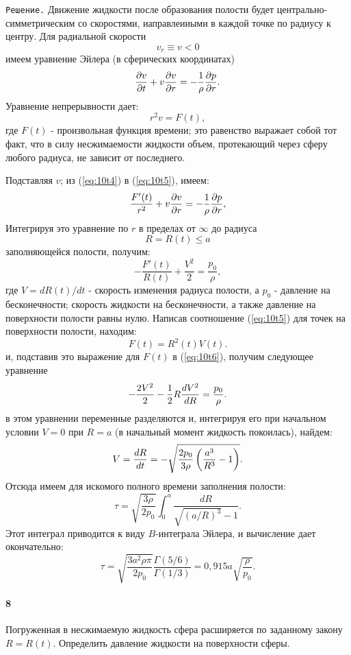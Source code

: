 \texttt{Решение.} Движение жидкости после образования полости будет
центрально-симметрическим со скоростями, иаправлеииыми  в каждой точке по
 радиусу к центру.  Для радиальной скорости
\[
   v_r \equiv v<0
\]
имеем уравнение Эйлера (в сферических координатах)
\begin{equation}
   \label{eq:10t4}
   \frac{\partial{v}}{\partial{t}} + v \frac{\partial{v}}{\partial{r}} = - \frac1{\rho} \frac{\partial{p}}{\partial{r}}.
\end{equation}
Уравнение непрерывности дает:
\begin{equation}
   \label{eq:10t5}
   r^2v = F(t),
\end{equation}
где  $F(t)$ - произвольная функция времени; это равенство выражает собой тот
факт, что в силу несжимаемости жидкости объем, протекающий через сферу любого
радиуса, не зависит от последнего.

Подставляя $v$; из (\ref{eq:10t4}) в (\ref{eq:10t5}), имеем:
\[
   \frac{F'(t)}{r^2} + v \frac{\partial{v}}{\partial{r}} = - \frac1{\rho} \frac{\partial{p}}{\partial{r}},
\]
Интегрируя это уравнение по $r$ в пределах от $\infty$ до радиуса
\[
   R = R(t) \leq a
\]
заполняющейся полости, получим:
\begin{equation}
   \label{eq:10t6}
   - \frac{F'(t)}{R(t)} + \frac{V^2}{2} = \frac{p_0}{\rho},
\end{equation}
где $V = dR(t)/dt$ - скорость изменения радиуса полости, а $p_0$ - давление на
бесконечности; скорость жидкости на бесконечности, а также давление на
поверхности полости равны нулю. Написав соотношение (\ref{eq:10t5}) для точек на поверхности
полости, находим:
\[
   F(t) = R^2(t)V(t).
\]
и, подставив это выражение для $F(t)$ в (\ref{eq:10t6}), получим следующее уравнение
\begin{equation}
   \label{eq:10t7}
   - \frac{2V^2}{2} - \frac{1}{2} R \frac{d{V^2}}{d{R}} = \frac{p_0}{\rho}.
\end{equation}
в этом уравнении переменные разделяются и, интегрируя его при начальном условии
$V=0$ при $R=a$ (в начальный момент жидкость покоилась), найдем:
\[
   V = \frac{d{R}}{d{t}} = - \sqrt{\frac{2p_0}{3\rho}\left(\frac{a^3}{R^3}-1\right)}.
\]
Отсюда имеем для искомого полного времени заполнения полости:
\[
   \tau = \sqrt{\frac{3\rho}{2p_0}}\int_0^a{\frac{dR}{\sqrt{(a/R)^3}-1}}.
\]
Этот интеграл приводится к виду $B$-интеграла Эйлера, и вычисление дает
окончательно:
\[
   \tau = \sqrt{\frac{3a^2 \rho \pi}{2p_0}} \frac{\Gamma(5/6)}{\Gamma(1/3)} =
   0,915a \sqrt{\frac{\rho}{p_0}}.
\]

\paragraph*{8}
Погруженная в несжимаемую жидкость сфера расширяется по заданному закону
$R=R(t)$. Определить давление жидкости на поверхности сферы.

